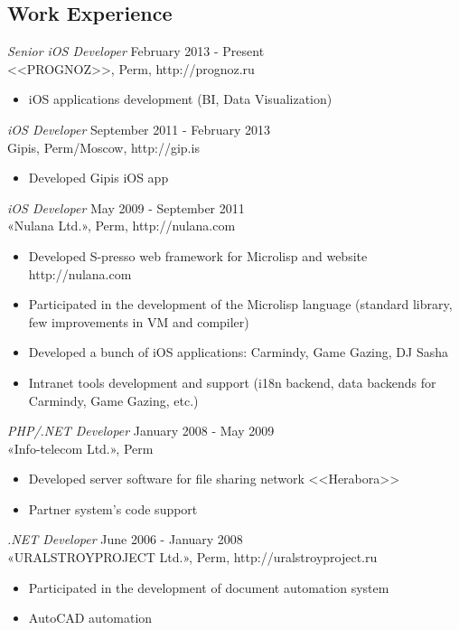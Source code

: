 \documentclass[13pt]{res}
\begin{document}
\begin{resume}
\section{Work Experience}

{\sl Senior iOS Developer} \hfill February 2013 - Present \\
<<PROGNOZ>>, Perm, http://prognoz.ru 
\begin{itemize} 
\item iOS applications development (BI, Data Visualization)
\end{itemize}

{\sl iOS Developer} \hfill September 2011 - February 2013 \\
Gipis, Perm/Moscow, http://gip.is 
\begin{itemize} 
\item Developed Gipis iOS app
\end{itemize}

{\sl iOS Developer} \hfill May 2009 - September 2011 \\
«Nulana Ltd.», Perm, http://nulana.com
\begin{itemize} 
\item Developed S-presso web framework for Microlisp and website http://nulana.com
\item Participated in the development of the Microlisp language (standard library, few improvements in VM and compiler)
\item Developed a bunch of iOS applications: Carmindy, Game Gazing, DJ Sasha
\item Intranet tools development and support (i18n backend, data backends for Carmindy, Game Gazing, etc.)
\end{itemize}
\newpage
{\sl PHP/.NET Developer} \hfill January 2008 - May 2009 \\
«Info-telecom Ltd.», Perm
\begin{itemize}
\item Developed server software for file sharing network <<Herabora>>
\item Partner system's code support
\end{itemize} 

{\sl .NET Developer} \hfill June 2006 - January 2008 \\
«URALSTROYPROJECT Ltd.», Perm, http://uralstroyproject.ru
\begin{itemize}
\item Participated in the development of document automation system
\item AutoCAD automation
\end{itemize} 


\end{resume}
\end{document}
